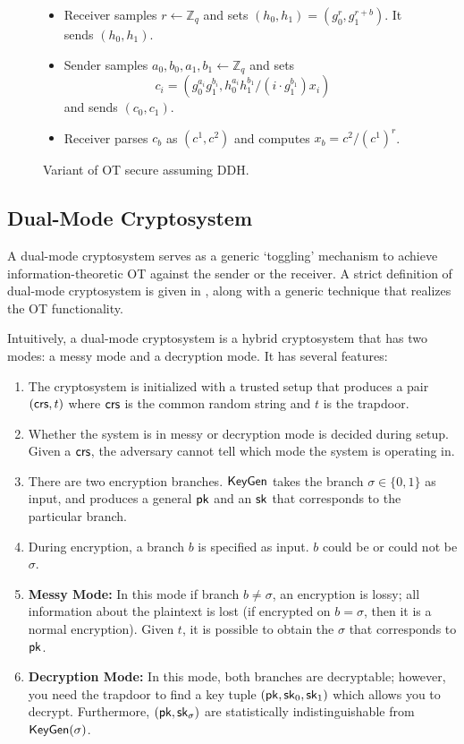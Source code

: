 \begin{figure}[h]
	\begin{mdframed}[
		linecolor=black,
		linewidth=1pt,
		roundcorner=5pt,
		backgroundcolor=white,
		userdefinedwidth=\textwidth,
		]
		\vspace{2mm}
		\begin{itemize}
			\item Receiver samples $r\gets\mathbb{Z}_q$ and sets $(h_0, h_1)=(g_0^r, g_1^{r+b})$. It sends $(h_0, h_1)$.
			\item Sender samples $a_0, b_0, a_1, b_1\gets\mathbb{Z}_q$ and sets $$c_i = (g_0^{a_i}g_1^{b_i}, h_0^{a_i}h_1^{b_1}/(i\cdot g_1^{b_1})x_i)$$ and sends $(c_0, c_1)$.
			\item Receiver parses $c_b$ as $(c^1, c^2)$ and computes $x_b = c^2/(c^1)^r$.
		\end{itemize}
		\vspace{2mm}
	\end{mdframed}
	\caption{Variant of OT secure assuming DDH.}
	\label{fig:DDHOT}
\end{figure}

\subsection{Dual-Mode Cryptosystem} A dual-mode cryptosystem serves as a generic `toggling' mechanism to achieve information-theoretic OT against the sender or the receiver. A strict definition of dual-mode cryptosystem is given in \cite{dualmode}, along with a generic technique that realizes the OT functionality.

Intuitively, a dual-mode cryptosystem is a hybrid cryptosystem that has two modes: a messy mode and a decryption mode. It has several features:

\begin{enumerate}
	\item The cryptosystem is initialized with a trusted setup that produces a pair $(\mathsf{crs}, t)$ where $\mathsf{crs}$ is the common random string and $t$ is the trapdoor.
	\item Whether the system is in messy or decryption mode is decided during setup. Given a $\mathsf{crs}$, the adversary cannot tell which mode the system is operating in.
	\item There are two encryption branches. $\mathsf{KeyGen}$ takes the branch $\sigma\in\{0,1\}$ as input, and produces a general $\mathsf{pk}$ and an $\mathsf{sk}$ that corresponds to the particular branch.
	\item During encryption, a branch $b$ is specified as input. $b$ could be or could not be $\sigma$.
	\item\textbf{Messy Mode:} In this mode if branch $b\neq\sigma$, an encryption is lossy; all information about the plaintext is lost (if encrypted on $b=\sigma$, then it is a normal encryption). Given $t$, it is possible to obtain the $\sigma$ that corresponds to $\mathsf{pk}$. 
	\item\textbf{Decryption Mode:} In this mode, both branches are decryptable; however, you need the trapdoor to find a key tuple $(\mathsf{pk},\mathsf{sk}_0,\mathsf{sk}_1)$ which allows you to decrypt. Furthermore, $(\mathsf{pk},\mathsf{sk}_\sigma)$ are statistically indistinguishable from $\mathsf{KeyGen}(\sigma)$.
\end{enumerate}

